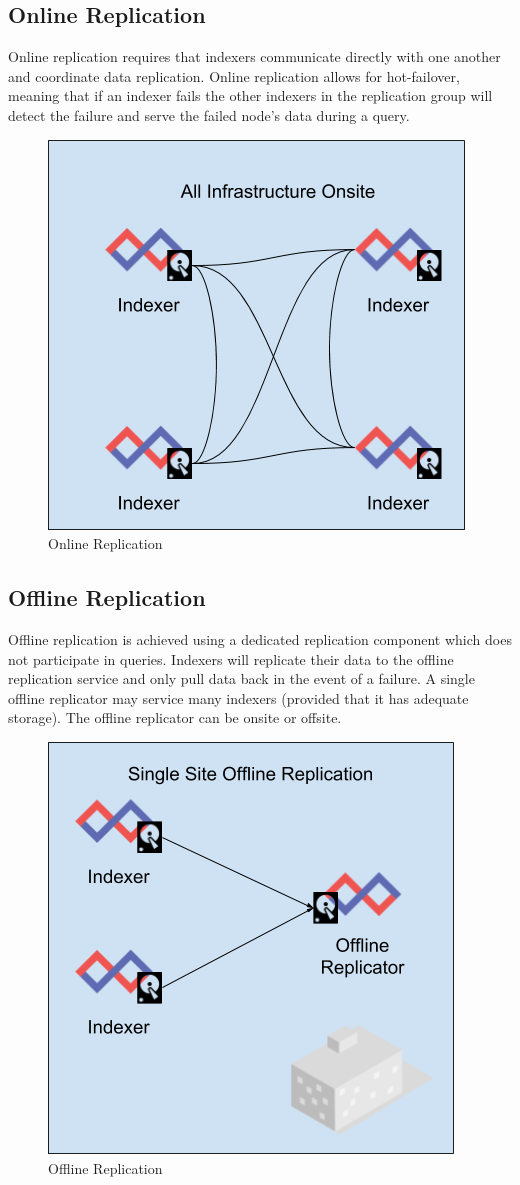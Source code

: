 {\subsection{Online Replication}

Online replication requires that indexers communicate directly with one
another and coordinate data replication. Online replication allows for
hot-failover, meaning that if an indexer fails the other indexers in the
replication group will detect the failure and serve the failed node's
data during a query.

\begin{figure}[H]
	\includegraphics[width=0.6\linewidth]{images/onlinereplication.png}	
	\caption{Online Replication}
	\label{fig:onlinereplication}
\end{figure}


\subsection{Offline Replication}

Offline replication is achieved using a dedicated replication component
which does not participate in queries. Indexers will replicate their
data to the offline replication service and only pull data back in the
event of a failure. A single offline replicator may service many
indexers (provided that it has adequate storage). The offline
replicator can be onsite or offsite.

\begin{figure}[H]
	\includegraphics[width=0.6\linewidth]{images/offlinereplication.png}
	\caption{Offline Replication}
	\label{fig:offlinereplication}
\end{figure}

}
